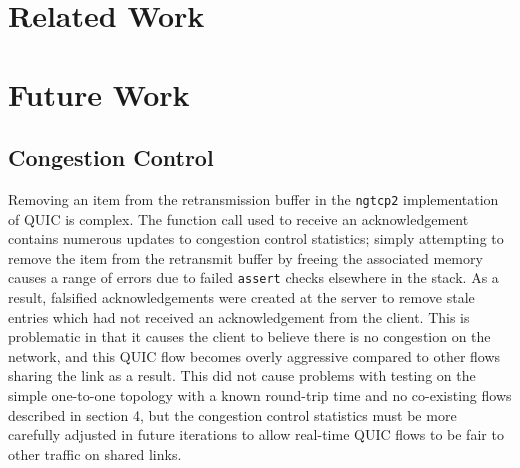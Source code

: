 \documentclass{mpaper}
\begin{document}
\clearpage
\section{Related Work}

%
% 



\section{Future Work}

\subsection{Congestion Control}
Removing an item from the retransmission buffer in the \texttt{ngtcp2} implementation of QUIC is complex. The function call used to receive an acknowledgement contains numerous updates to congestion control statistics; simply attempting to remove the item from the retransmit buffer by freeing the associated memory causes a range of errors due to failed \texttt{assert} checks elsewhere in the stack. As a result, falsified acknowledgements were created at the server to remove stale entries which had not received an acknowledgement from the client. This is problematic in that it causes the client to believe there is no congestion on the network, and this QUIC flow becomes overly aggressive compared to other flows sharing the link as a result. This did not cause problems with testing on the simple one-to-one topology with a known round-trip time and no co-existing flows described in section 4, but the congestion control statistics must be more carefully adjusted in future iterations to allow real-time QUIC flows to be fair to other traffic on shared links.
\end{document}
